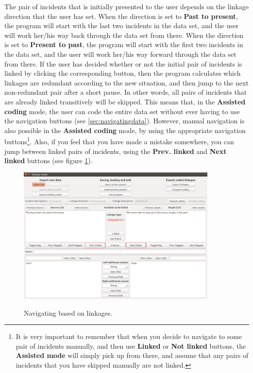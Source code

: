 \documentclass{memoir}
\begin{document}
The pair of incidents that is initially presented to the user depends on the linkage direction that the user has set. When the direction is set to \textbf{Past to present}, the program will start with the last two incidents in the data set, and the user will work her/his way back through the data set from there. When the direction is set to \textbf{Present to past}, the program will start with the first two incidents in the data set, and the user will work her/his way forward through the data set from there. If the user has decided whether or not the initial pair of incidents is linked by clicking the corresponding button, then the program calculates which linkages are redundant according to the new situation, and then jump to the next non-redundant pair after a short pause. In other words, all pairs of incidents that are already linked transitively will be skipped. This means that, in the \textbf{Assisted coding} mode, the user can code the entire data set without ever having to use the navigation buttons (see \ref{sec:navigatingdata}). However, manual navigation is also possible in the \textbf{Assisted coding} mode, by using the appropriate navigation buttons\footnote{It is very important to remember that when you decide to navigate to some pair of incidents manually, and then use \textbf{Linked} or \textbf{Not linked} buttons, the \textbf{Assisted mode} will simply pick up from there, and assume that any pairs of incidents that you have skipped manually are not linked.}. Also, if you feel that you have made a mistake somewhere, you can jump between linked pairs of incidents, using the \textbf{Prev. linked} and \textbf{Next linked} buttons (see figure \ref{fig:linkedbuttons}).

\begin{figure}[h!]
  \centering
  \caption{Navigating based on linkages.}
  \includegraphics[width=100mm]{Screenshot_21.pdf}
  \label{fig:linkedbuttons}
\end{figure}
\end{document}
